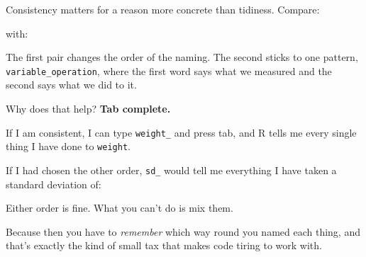 \documentclass[
  letterpaper,
  justified,
  a4paper]{tufte-book}
\makeatletter
\newenvironment{Shaded}{\begin{snugshade}}{\end{snugshade}}
\newcommand{\FunctionTok}[1]{\textcolor[rgb]{0.28,0.35,0.67}{#1}}
\newcommand{\NormalTok}[1]{\textcolor[rgb]{0.00,0.23,0.31}{#1}}
\newcommand{\OtherTok}[1]{\textcolor[rgb]{0.00,0.23,0.31}{#1}}
\newcommand{\SpecialCharTok}[1]{\textcolor[rgb]{0.37,0.37,0.37}{#1}}
\let\rbporigShaded\Shaded
\let\rbporigendShaded\endShaded
\renewenvironment{Shaded}{%
  \begingroup
  \ifdim\linewidth=\rbpbodywidth
    \advance\linewidth by \@tufte@overhang
    \advance\hsize by \@tufte@overhang
    \advance\columnwidth by \@tufte@overhang
  \fi
  \rbporigShaded
}{%
  \rbporigendShaded
  \endgroup
}
\makeatother
\begin{document}
Consistency matters for a reason more concrete than tidiness. Compare:

\begin{Shaded}
\end{Shaded}

with:

\begin{Shaded}
\end{Shaded}

The first pair changes the order of the naming. The second sticks to one
pattern, \texttt{variable\_operation}, where the first word says what we
measured and the second says what we did to it.

Why does that help? \textbf{Tab complete.}

If I am consistent, I can type \texttt{weight\_} and press tab, and R
tells me every single thing I have done to \texttt{weight}.

If I had chosen the other order, \texttt{sd\_} would tell me everything
I have taken a standard deviation of:

\begin{Shaded}
\end{Shaded}

Either order is fine. What you can't do is mix them.

Because then you have to \emph{remember} which way round you named each
thing, and that's exactly the kind of small tax that makes code tiring
to work with.
\end{document}
